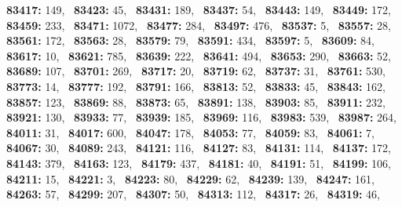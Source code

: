 \textbf{83417:} 149,\allowbreak~ 
\textbf{83423:} 45,\allowbreak~ 
\textbf{83431:} 189,\allowbreak~ 
\textbf{83437:} 54,\allowbreak~ 
\textbf{83443:} 149,\allowbreak~ 
\textbf{83449:} 172,\allowbreak~ 
\textbf{83459:} 233,\allowbreak~ 
\textbf{83471:} 1072,\allowbreak~ 
\textbf{83477:} 284,\allowbreak~ 
\textbf{83497:} 476,\allowbreak~ 
\textbf{83537:} 5,\allowbreak~ 
\textbf{83557:} 28,\allowbreak~ 
\textbf{83561:} 172,\allowbreak~ 
\textbf{83563:} 28,\allowbreak~ 
\textbf{83579:} 79,\allowbreak~ 
\textbf{83591:} 434,\allowbreak~ 
\textbf{83597:} 5,\allowbreak~ 
\textbf{83609:} 84,\allowbreak~ 
\textbf{83617:} 10,\allowbreak~ 
\textbf{83621:} 785,\allowbreak~ 
\textbf{83639:} 222,\allowbreak~ 
\textbf{83641:} 494,\allowbreak~ 
\textbf{83653:} 290,\allowbreak~ 
\textbf{83663:} 52,\allowbreak~ 
\textbf{83689:} 107,\allowbreak~ 
\textbf{83701:} 269,\allowbreak~ 
\textbf{83717:} 20,\allowbreak~ 
\textbf{83719:} 62,\allowbreak~ 
\textbf{83737:} 31,\allowbreak~ 
\textbf{83761:} 530,\allowbreak~ 
\textbf{83773:} 14,\allowbreak~ 
\textbf{83777:} 192,\allowbreak~ 
\textbf{83791:} 166,\allowbreak~ 
\textbf{83813:} 52,\allowbreak~ 
\textbf{83833:} 45,\allowbreak~ 
\textbf{83843:} 162,\allowbreak~ 
\textbf{83857:} 123,\allowbreak~ 
\textbf{83869:} 88,\allowbreak~ 
\textbf{83873:} 65,\allowbreak~ 
\textbf{83891:} 138,\allowbreak~ 
\textbf{83903:} 85,\allowbreak~ 
\textbf{83911:} 232,\allowbreak~ 
\textbf{83921:} 130,\allowbreak~ 
\textbf{83933:} 77,\allowbreak~ 
\textbf{83939:} 185,\allowbreak~ 
\textbf{83969:} 116,\allowbreak~ 
\textbf{83983:} 539,\allowbreak~ 
\textbf{83987:} 264,\allowbreak~ 
\textbf{84011:} 31,\allowbreak~ 
\textbf{84017:} 600,\allowbreak~ 
\textbf{84047:} 178,\allowbreak~ 
\textbf{84053:} 77,\allowbreak~ 
\textbf{84059:} 83,\allowbreak~ 
\textbf{84061:} 7,\allowbreak~ 
\textbf{84067:} 30,\allowbreak~ 
\textbf{84089:} 243,\allowbreak~ 
\textbf{84121:} 116,\allowbreak~ 
\textbf{84127:} 83,\allowbreak~ 
\textbf{84131:} 114,\allowbreak~ 
\textbf{84137:} 172,\allowbreak~ 
\textbf{84143:} 379,\allowbreak~ 
\textbf{84163:} 123,\allowbreak~ 
\textbf{84179:} 437,\allowbreak~ 
\textbf{84181:} 40,\allowbreak~ 
\textbf{84191:} 51,\allowbreak~ 
\textbf{84199:} 106,\allowbreak~ 
\textbf{84211:} 15,\allowbreak~ 
\textbf{84221:} 3,\allowbreak~ 
\textbf{84223:} 80,\allowbreak~ 
\textbf{84229:} 62,\allowbreak~ 
\textbf{84239:} 139,\allowbreak~ 
\textbf{84247:} 161,\allowbreak~ 
\textbf{84263:} 57,\allowbreak~ 
\textbf{84299:} 207,\allowbreak~ 
\textbf{84307:} 50,\allowbreak~ 
\textbf{84313:} 112,\allowbreak~ 
\textbf{84317:} 26,\allowbreak~ 
\textbf{84319:} 46,\allowbreak~ 
